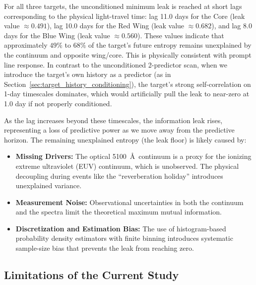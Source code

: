\documentclass[12pt, a4paper]{article}
\begin{document}
For all three targets, the unconditioned minimum leak is reached at short lags corresponding to the physical light-travel time: lag 11.0 days for the Core (leak value $\approx 0.491$), lag 10.0 days for the Red Wing (leak value $\approx 0.682$), and lag 8.0 days for the Blue Wing (leak value $\approx 0.560$). These values indicate that approximately $49\%$ to $68\%$ of the target's future entropy remains unexplained by the continuum and opposite wing/core. This is physically consistent with prompt line response. In contrast to the unconditioned 2-predictor scan, when we introduce the target's own history as a predictor (as in Section~\ref{sec:target_history_conditioning}), the target's strong self-correlation on 1-day timescales dominates, which would artificially pull the leak to near-zero at 1.0 day if not properly conditioned.

As the lag increases beyond these timescales, the information leak rises, representing a loss of predictive power as we move away from the predictive horizon. The remaining unexplained entropy (the leak floor) is likely caused by:
\begin{itemize}
\item \textbf{Missing Drivers:} The optical 5100~\AA\ continuum is a proxy for the ionizing extreme ultraviolet (EUV) continuum, which is unobserved. The physical decoupling during events like the ``reverberation holiday'' introduces unexplained variance.
\item \textbf{Measurement Noise:} Observational uncertainties in both the continuum and the spectra limit the theoretical maximum mutual information.
\item \textbf{Discretization and Estimation Bias:} The use of histogram-based probability density estimators with finite binning introduces systematic sample-size bias that prevents the leak from reaching zero.
\end{itemize}

\subsection{Limitations of the Current Study}
\label{sec:limitations}
\end{document}

